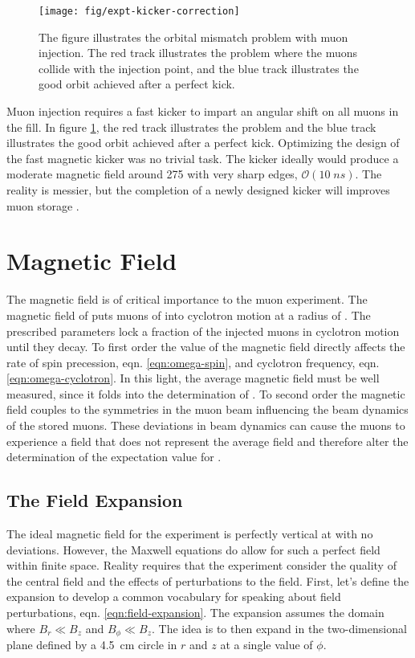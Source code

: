 \begin{figure}
\label{fig:expt-kicker-correction}
\centering
\texttt{[image: fig/expt-kicker-correction]}
\caption{The figure illustrates the orbital mismatch problem with muon injection.  The red track illustrates the problem where the muons collide with the injection point, and the blue track illustrates the good orbit achieved after a perfect kick.}
\end{figure}

Muon injection requires a fast kicker to impart an angular shift on all muons in the fill. In figure \ref{fig:expt-kicker-correction}, the red track illustrates the problem and the blue track illustrates the good orbit achieved after a perfect kick. Optimizing the design of the \gmtwo fast magnetic kicker was no trivial task.  The kicker ideally would produce a moderate magnetic field around \SI{275}{\gauss} with very sharp edges, $\mathcal{O}(10\;ns)$. The reality is messier, but the completion of a newly designed kicker will improves muon storage \cite{e989-tdr}.  

\section{Magnetic Field} \label{sec:magnetic-field}

The magnetic field is of critical importance to the muon \gmtwo experiment.  The magnetic field of \bmagic puts muons of \pmagic into cyclotron motion at a radius of \rmagic.  The prescribed parameters lock a fraction of the injected muons in cyclotron motion until they decay.  To first order the value of the magnetic field directly affects the rate of spin precession, eqn. \ref{eqn:omega-spin}, and cyclotron frequency, eqn. \ref{eqn:omega-cyclotron}.  In this light, the average magnetic field must be well measured, since it folds into the determination of \wa.  To second order the magnetic field couples to the symmetries in the muon beam influencing the beam dynamics of the stored muons.  These deviations in beam dynamics can cause the muons to experience a field that does not represent the average field and therefore alter the determination of the expectation value for \wa.

\subsection{The Field Expansion}

The ideal magnetic field for the experiment is perfectly vertical at \bmagic with no deviations.  However, the Maxwell equations do allow for such a perfect field within finite space.  Reality requires that the experiment consider the quality of the central field and the effects of perturbations to the field.  First, let's define the expansion to develop a common vocabulary for speaking about field perturbations, eqn. \ref{eqn:field-expansion}.  The expansion assumes the domain where $B_r \ll B_z$ and $B_\phi \ll B_z$.  The idea is to then expand in the two-dimensional plane defined by a \SI{4.5}{\cm} circle in $r$ and $z$ at a single value of $\phi$.

